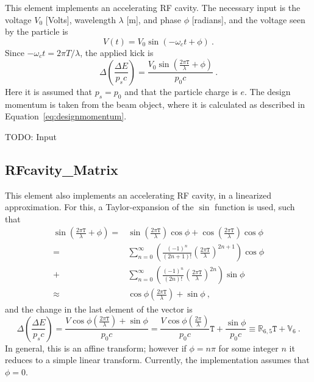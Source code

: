 \documentclass[a4paper]{report}
\begin{document}
This element implements an accelerating RF cavity.
The necessary input is the voltage $V_0$ [Volts], wavelength $\lambda$ [m], and phase $\phi$ [radians], and the voltage seen by the particle is
\begin{equation}
  V(t) = V_0 \sin\left( -\omega_c t + \phi \right)~.
\end{equation}
Since $ -\omega_c t = 2\pi T / \lambda$, the applied kick is 
\begin{equation}
  \Delta \left(\frac{\Delta E}{p_s c}\right) = \frac{V_0 \sin\left(\frac{2\pi \mathtt{T} }{\lambda}+\phi\right)}{p_0 c}~.
\end{equation}
Here it is assumed that $p_s = p_0$ and that the particle charge is $e$.
The design momentum is taken from the beam object, where it is calculated as described in Equation~\eqref{eq:designmomentum}.


TODO: Input

\subsection{RFcavity\_Matrix}

This element also implements an accelerating RF cavity, in a linearized approximation.
For this, a Taylor-expansion of the $\sin$ function is used, such that
\begin{equation}
  \begin{split}
    \sin\left(\frac{2\pi \mathtt{T} }{\lambda}+\phi\right) =& \sin\left(\frac{2\pi \mathtt{T} }{\lambda}\right)\cos\phi + \cos\left(\frac{2\pi \mathtt{T} }{\lambda}\right)\cos\phi \\
    =&
    \sum_{n=0}^\infty \left( \frac{(-1)^n}{(2n+1)!} \left(\frac{2\pi \mathtt{T}}{\lambda}\right)^{2n+1} \right) \cos\phi \\
    +& 
    \sum_{n=0}^\infty \left( \frac{(-1)^n}{(2n)!} \left(\frac{2\pi \mathtt{T}}{\lambda}\right)^{2n} \right) \sin\phi \\
    \approx& \cos\phi \left(\frac{2\pi \mathtt{T}}{\lambda}\right) + \sin\phi ~,
  \end{split}
\end{equation}
and the change in the last element of the vector is
\begin{equation}
  \Delta \left(\frac{\Delta E}{p_s c}\right) = \frac{V \cos\phi \left(\frac{2\pi \mathtt{T}}{\lambda}\right) + \sin\phi}{p_0 c} = \frac{V \cos\phi \left(\frac{2\pi }{\lambda}\right)}{p_0 c} \mathtt{T} + \frac{\sin\phi}{p_0c} \equiv \mathbb{R}_{6,5} \mathtt{T} + \mathbb{V}_6 ~.
\end{equation}
In general, this is an affine transform; however if $\phi = n\pi$ for some integer $n$ it reduces to a simple linear transform. Currently, the implementation assumes that $\phi = 0$.
\end{document}
